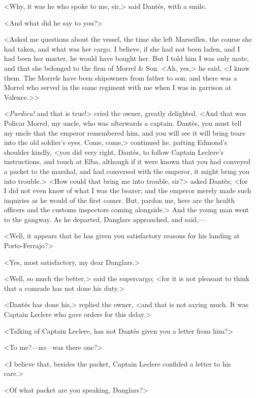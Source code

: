  <Why, it was he who spoke to me, sir,> said Dantès, with a smile. 

 <And what did he say to you?> 

 <Asked me questions about the vessel, the time she left Marseilles, the course she had taken, and what was her cargo. I believe, if she had not been laden, and I had been her master, he would have bought her. But I told him I was only mate, and that she belonged to the firm of Morrel \& Son. <Ah, yes,> he said, <I know them. The Morrels have been shipowners from father to son; and there was a Morrel who served in the same regiment with me when I was in garrison at Valence.>> 

 <\textit{Pardieu!} and that is true!> cried the owner, greatly delighted. <And that was Policar Morrel, my uncle, who was afterwards a captain. Dantès, you must tell my uncle that the emperor remembered him, and you will see it will bring tears into the old soldier's eyes. Come, come,> continued he, patting Edmond's shoulder kindly, <you did very right, Dantès, to follow Captain Leclere's instructions, and touch at Elba, although if it were known that you had conveyed a packet to the marshal, and had conversed with the emperor, it might bring you into trouble.>  <How could that bring me into trouble, sir?> asked Dantès; <for I did not even know of what I was the bearer; and the emperor merely made such inquiries as he would of the first comer. But, pardon me, here are the health officers and the customs inspectors coming alongside.> And the young man went to the gangway. As he departed, Danglars approached, and said,— 

 <Well, it appears that he has given you satisfactory reasons for his landing at Porto-Ferrajo?> 

 <Yes, most satisfactory, my dear Danglars.> 

 <Well, so much the better,> said the supercargo; <for it is not pleasant to think that a comrade has not done his duty.> 

 <Dantès has done his,> replied the owner, <and that is not saying much. It was Captain Leclere who gave orders for this delay.> 

 <Talking of Captain Leclere, has not Dantès given you a letter from him?> 

 <To me?—no—was there one?> 

 <I believe that, besides the packet, Captain Leclere confided a letter to his care.> 

 <Of what packet are you speaking, Danglars?> 

